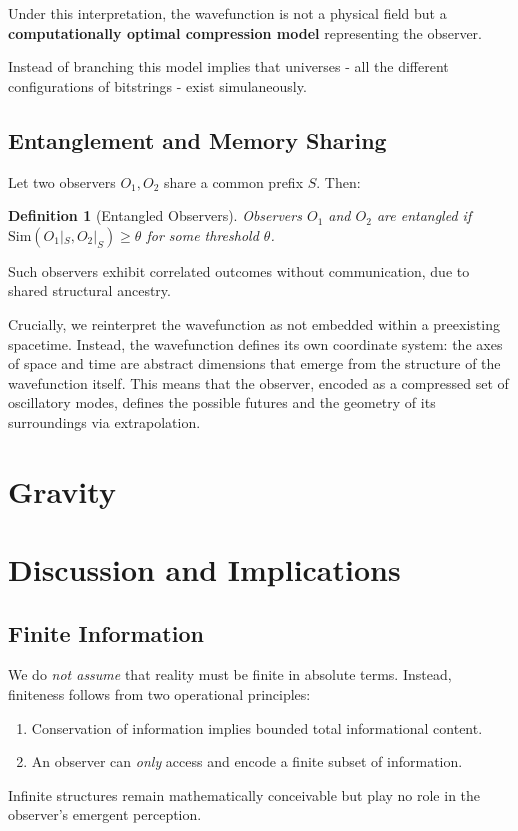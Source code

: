 \documentclass[11pt]{article}
\newtheorem{definition}{Definition}
\begin{document}
Under this interpretation, the wavefunction is not a physical field but a \textbf{computationally optimal compression model} representing the observer.

Instead of branching \cite{everett1957relative} this model implies that universes - all the different configurations of bitstrings - exist simulaneously.


\subsection{Entanglement and Memory Sharing}

Let two observers \(O_1, O_2\) share a common prefix \(S\). Then:

\begin{definition}[Entangled Observers]
    Observers \(O_1\) and \(O_2\) are entangled if \(\mathrm{Sim}(O_1|_S, O_2|_S)\ge\theta\) for some threshold \(\theta\).
\end{definition}

Such observers exhibit correlated outcomes without communication, due to shared structural ancestry.

Crucially, we reinterpret the wavefunction as not embedded within a preexisting spacetime. Instead, the wavefunction defines its own coordinate system: the axes of space and time are abstract dimensions that emerge from the structure of the wavefunction itself. This means that the observer, encoded as a compressed set of oscillatory modes, defines the possible futures and the geometry of its surroundings via extrapolation.


\section{Gravity}




\section{Discussion and Implications}

\subsection{Finite Information}

We do \emph{not assume} that reality must be finite in absolute terms. Instead, finiteness follows from two operational principles:
\begin{enumerate}
    \item Conservation of information implies bounded total informational content.
    \item An observer can \emph{only} access and encode a finite subset of information.
\end{enumerate}
Infinite structures remain mathematically conceivable but play no role in the observer’s emergent perception.
\end{document}
